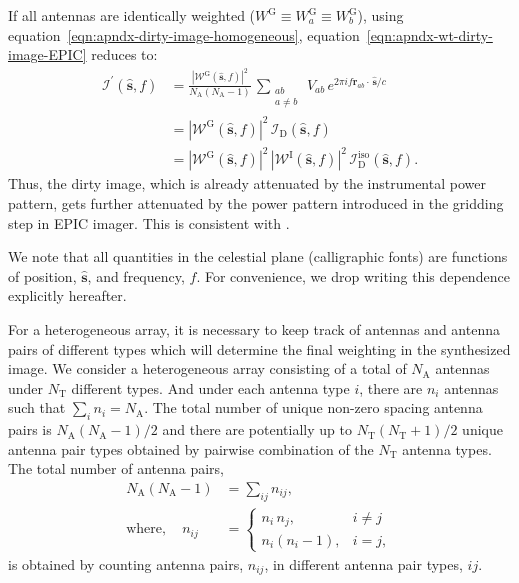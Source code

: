 \documentclass[a4paper,fleqn,usenatbib]{mnras}
\newcommand{\Nant}{N_\textrm{A}}
\begin{document}
If all antennas are identically weighted ($W^\textrm{G} \equiv W^\textrm{G}_a \equiv W^\textrm{G}_b$), using equation~\ref{eqn:apndx-dirty-image-homogeneous}, equation~\ref{eqn:apndx-wt-dirty-image-EPIC} reduces to: 
\begin{align}\label{eqn:apndx-wt-dirty-image-homogeneous}
  \mathcal{I}^\prime(\hat{\mathbf{s}},f) &= \frac{\left|\mathcal{W}^\textrm{G}(\hat{\mathbf{s}},f)\right|^2}{\Nant(\Nant-1)}\,\sum_{\substack{ab\\a\ne b}}\,V_{ab}\,e^{2\pi i f\mathbf{r}_{ab}\!\cdot\,\hat{\mathbf{s}}/c} \nonumber\\
  &= \left|\mathcal{W}^\textrm{G}(\hat{\mathbf{s}},f)\right|^2\,\mathcal{I}_\textrm{D}(\hat{\mathbf{s}},f) \nonumber\\
  &= \left|\mathcal{W}^\textrm{G}(\hat{\mathbf{s}},f)\right|^2\,\left|\mathcal{W}^\textrm{I}(\hat{\mathbf{s}},f)\right|^2\,\mathcal{I}_\textrm{D}^\textrm{iso}(\hat{\mathbf{s}},f).
\end{align}
Thus, the dirty image, which is already attenuated by the instrumental power pattern, gets further attenuated by the power pattern introduced in the gridding step in EPIC imager. This is consistent with \citet{mor09}. 

We note that all quantities in the celestial plane (calligraphic fonts) are functions of position, $\hat{\mathbf{s}}$, and frequency, $f$. For convenience, we drop writing this dependence explicitly hereafter.

For a heterogeneous array, it is necessary to keep track of antennas and antenna pairs of different types which will determine the final weighting in the synthesized image. We consider a heterogeneous array consisting of a total of $\Nant$ antennas under $N_\textrm{T}$ different types. And under each antenna type $i$, there are $n_i$ antennas such that $\sum_i n_i = \Nant$. The total number of unique non-zero spacing antenna pairs is $\Nant(\Nant-1)/2$ and there are potentially up to $N_\textrm{T}(N_\textrm{T}+1)/2$ unique antenna pair types obtained by pairwise combination of the $N_\textrm{T}$ antenna types. The total number of antenna pairs, 
\begin{align}\label{eqn:apndx-total-baselines}
  \Nant(\Nant-1) &= \sum_{ij} n_{ij}, \\
  \textrm{where}, \quad   n_{ij} &= \begin{cases}
    n_i\,n_j, & i\ne j \\
    n_i(n_i-1), & i=j, 
  \end{cases}
\end{align}
is obtained by counting antenna pairs, $n_{ij}$, in different antenna pair types, $ij$.
\end{document}
